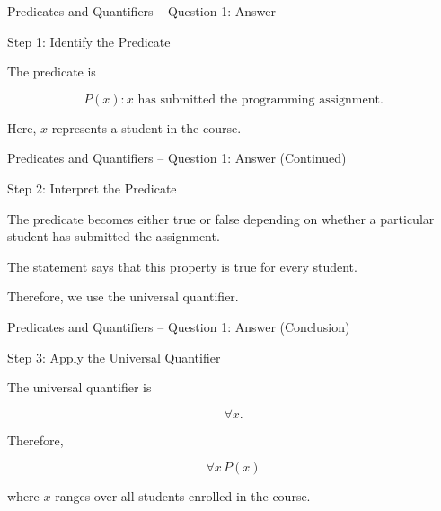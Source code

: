 
\begin{frame}{Predicates and Quantifiers -- Question 1: Answer}

\begin{exampleblock}{Step 1: Identify the Predicate}

The predicate is

$$
P(x):\text{$x$ has submitted the programming assignment}.
$$

Here, $x$ represents a student in the course.

\end{exampleblock}

\end{frame}


\begin{frame}{Predicates and Quantifiers -- Question 1: Answer (Continued)}

\begin{exampleblock}{Step 2: Interpret the Predicate}

The predicate becomes either true or false depending on whether a
particular student has submitted the assignment.

The statement says that this property is true for every student.

Therefore, we use the universal quantifier.

\end{exampleblock}

\end{frame}


\begin{frame}{Predicates and Quantifiers -- Question 1: Answer (Conclusion)}

\begin{exampleblock}{Step 3: Apply the Universal Quantifier}

The universal quantifier is

$$
\forall x.
$$

Therefore,

$$
\boxed{\forall x\,P(x)}
$$

where $x$ ranges over all students enrolled in the course.

\end{exampleblock}

\end{frame}

